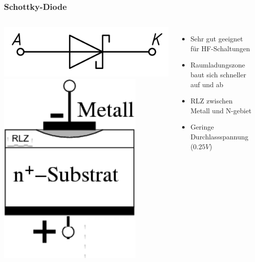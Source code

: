 \begin{frame}
    \frametitle{Schottky-Diode}
    \begin{columns}[c]
        \column[c]{5cm}
        \begin{center}
            \includegraphics[width=1\textwidth]{a05/Diode-Schottky-EN_A-K.png}\\
            \includegraphics[width=0.8\textwidth]{a05/AusfuerungsformenSchottkyDiode.png}
            \tiny \hyperlink{refs}{\cite{wm}}
        \end{center}
        \column{5cm}
    \begin{itemize}
			\item Sehr gut geeignet für HF-Schaltungen
			\item Raumladungszone baut sich schneller auf und ab
			\item RLZ zwischen Metall und N-gebiet
			\item Geringe Durchlassspannung ($0.25V$)
    \end{itemize}
    \end{columns}
\end{frame}

